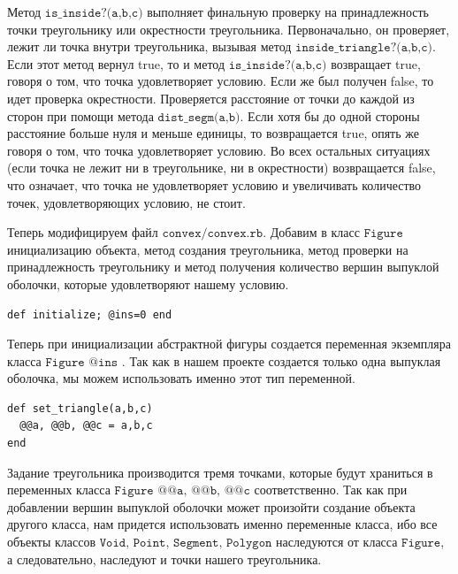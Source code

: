 Метод $\texttt{is\_inside?(a,b,c)}$ выполняет финальную проверку на принадлежность точки треугольнику или окрестности треугольника. Первоначально, он проверяет, лежит ли точка внутри треугольника, вызывая метод $\texttt{inside\_triangle?(a,b,c)}$. Если этот метод вернул true, то и метод $\texttt{is\_inside?(a,b,c)}$ возвращает true, говоря о том, что точка удовлетворяет условию. Если же был получен false, то идет проверка окрестности. Проверяется расстояние от точки до каждой из сторон при помощи метода $\texttt{dist\_segm(a,b)}$. Если хотя бы до одной стороны расстояние больше нуля и меньше единицы, то возвращается true, опять же говоря о том, что точка удовлетворяет условию. Во всех остальных ситуациях (если точка не лежит ни в треугольнике, ни в окрестности) возвращается false, что означает, что точка не удовлетворяет условию и увеличивать количество точек, удовлетворяющих условию, не стоит.

\newpage
Теперь модифицируем файл $\texttt{convex/convex.rb}$. Добавим в класс $\texttt{Figure}$  инициализацию объекта, метод создания треугольника, метод проверки
на принадлежность треугольнику и метод получения количество вершин выпуклой оболочки, которые удовлетворяют нашему условию.

\begin{small}
\begin{verbatim}
def initialize; @ins=0 end
\end{verbatim}
\end{small}

Теперь при инициализации абстрактной фигуры создается переменная экземпляра класса  $\texttt{Figure @ins}$ . Так как в нашем проекте создается только одна выпуклая
оболочка, мы можем использовать именно этот тип переменной.

\begin{small}
\begin{verbatim}
def set_triangle(a,b,c)
  @@a, @@b, @@c = a,b,c
end
\end{verbatim}
\end{small}

Задание треугольника производится тремя точками, которые будут храниться в переменных класса  $\texttt{Figure @@a, @@b, @@c}$ соответственно. Так как при добавлении вершин выпуклой оболочки может произойти создание объекта другого класса, нам придется использовать именно переменные класса, ибо все объекты классов 
$\texttt{Void, Point, Segment, Polygon}$ наследуются от класса $\texttt{Figure}$, а следовательно, наследуют и точки нашего треугольника.

